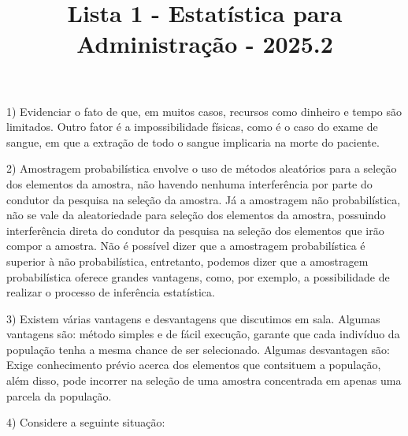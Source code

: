 \documentclass[12pt]{article}
\title{Lista 1 - Estatística para Administração - 2025.2}
\begin{document}
\date{}
\maketitle


1) Evidenciar o fato de que, em muitos casos, recursos como dinheiro e tempo são limitados. Outro fator é  a impossibilidade físicas,
 como é o caso do exame de sangue, em que a extração de todo o sangue implicaria na morte do paciente. 

2) Amostragem probabilística envolve o uso de métodos aleatórios para a seleção dos elementos da amostra, não havendo nenhuma interferência por parte do condutor da pesquisa na seleção da amostra. 
Já a amostragem não probabilística, não se vale da aleatoriedade para seleção dos elementos da amostra, possuindo interferência direta do condutor da pesquisa na seleção dos elementos que irão compor a amostra. 
Não é possível dizer que a amostragem probabilística é superior à não probabilística, entretanto, podemos dizer que a amostragem probabilística oferece grandes vantagens, como, por exemplo,
a possibilidade de realizar o processo de inferência estatística. 

3) Existem várias vantagens e desvantagens que discutimos em sala. Algumas vantagens são: método simples e de fácil execução, garante que cada indivíduo da população tenha a mesma chance de ser selecionado. 
Algumas desvantagen são: Exige conhecimento prévio acerca dos elementos que contsituem a população, além disso, pode incorrer na seleção de uma amostra concentrada em apenas uma parcela da população. 

4) Considere a seguinte situação:
\end{document}
